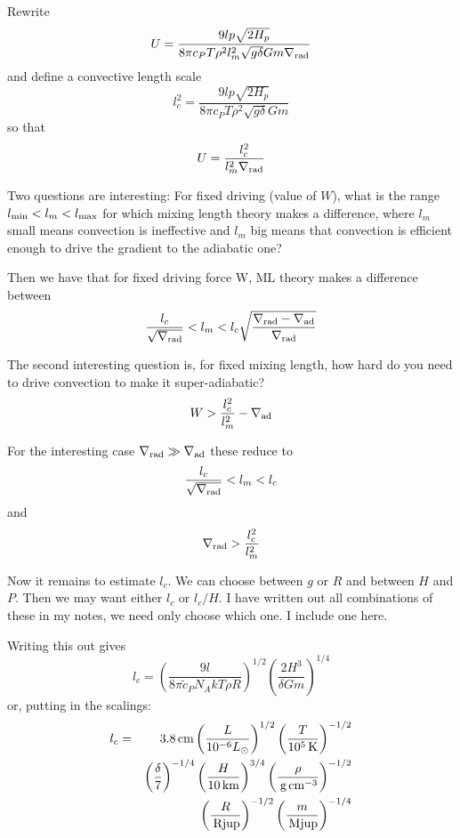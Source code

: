 \documentclass{emulateapj}
\newcommand{\nablaAd}{\nabla_{\rm ad}}
\newcommand{\nablaRad}{\nabla_{\rm rad}}
\newcommand{\scale}[2]{\left(\frac{#1}{#2}\right)}
\newcommand{\unit}[1]{\,\hbox{#1}}
\begin{document}
Rewrite 
\begin{equation}
  U = \frac{9 l p \sqrt{2 H_p}}
{8 \pi c_P T \rho^2 l_m^2 \sqrt{g \delta} G m \nablaRad}
\end{equation}
and define a convective length scale 
\begin{equation}
  l_c^2 = \frac{9 l p \sqrt{2 H_p}}
{8 \pi c_P T \rho^2 \sqrt{g \delta} G m }  
\end{equation}
so that
\begin{equation}
  U = \frac{l_c^2} {l_m^2 \nablaRad}
\end{equation}

Two questions are interesting: For fixed driving (value of $W$), what
is the range $l_{\rm min} < l_m < l_{\rm max}$ for which mixing length theory
makes a difference, where $l_m$ small means convection is ineffective
and $l_m$ big means that convection is efficient enough to drive the
gradient to the adiabatic one?

Then we have that for fixed driving force W, ML theory makes a
difference between
\begin{equation}
  \frac{l_c}{\sqrt{\nablaRad}} 
  < l_m < 
  l_c \sqrt{\frac{\nablaRad-\nablaAd}{\nablaRad}} 
\end{equation}

The second interesting question is, for fixed mixing length, how hard
do you need to drive convection to make it super-adiabatic?
\begin{equation}
  W > \frac{l_c^2}{l_m^2} - \nablaAd
\end{equation}

For the interesting case $\nablaRad \gg \nablaAd$ these reduce to 
\begin{equation}
  \frac{l_c}{\sqrt{\nablaRad}} < l_m < l_c  
\end{equation}
and
\begin{equation}
  \nablaRad  > \frac{l_c^2}{l_m^2}
\end{equation}

Now it remains to estimate $l_c$.  We can choose between $g$ or $R$
and between $H$ and $P$.  Then we may want either $l_c$ or $l_c/H$.  I
have written out all combinations of these in my notes, we need only
choose which one.  I include one here.

Writing this out gives
\begin{equation}
l_c = \scale{9 l}{8\pi \tilde{c}_P N_A k T \rho R}^{1/2} 
   \scale{2 H^3}{\delta G m}^{1/4} 
\end{equation}
or, putting in the scalings:
\begin{eqnarray}
l_c &=& 3.8 \unit{cm} 
  \scale{L}{10^{-6} L_\odot}^{1/2}
  \scale{T}{10^5 \unit{K}}^{-1/2}
\nonumber \\
& &
  \scale{\delta}{7}^{-1/4} 
  \scale{H}{10 \unit{km}}^{3/4} 
  \scale{\rho}{\unit{g}\unit{cm}^{-3}}^{-1/2} 
\nonumber \\
& &
  \scale{R}{\unit{Rjup}}^{-1/2}
  \scale{m}{\unit{Mjup}}^{-1/4} 
\end{eqnarray}
\end{document}
